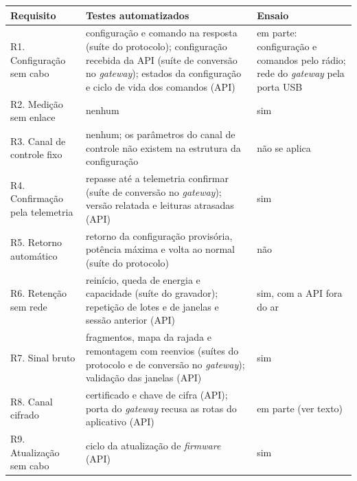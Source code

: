\begin{quadro}[!htb]
\centering\small
\caption{Requisitos da montagem de campo, testes e ensaios}\label{quadro:sis-rastreabilidade}
\begin{tabular}{@{}>{\raggedright\arraybackslash}p{32mm}>{\raggedright\arraybackslash}p{76mm}>{\raggedright\arraybackslash}p{42mm}@{}}
\toprule
Requisito & Testes automatizados & Ensaio \\
\midrule
R1. Configuração sem cabo & configuração e comando na resposta (suíte do protocolo); configuração recebida da API (suíte de conversão no \textit{gateway}); estados da configuração e ciclo de vida dos comandos (API) & em parte: configuração e comandos pelo rádio; rede do \textit{gateway} pela porta USB \\
\addlinespace
R2. Medição sem enlace & nenhum & sim \\
\addlinespace
R3. Canal de controle fixo & nenhum; os parâmetros do canal de controle não existem na estrutura da configuração & não se aplica \\
\addlinespace
R4. Confirmação pela telemetria & repasse até a telemetria confirmar (suíte de conversão no \textit{gateway}); versão relatada e leituras atrasadas (API) & sim \\
\addlinespace
R5. Retorno automático & retorno da configuração provisória, potência máxima e volta ao normal (suíte do protocolo) & não \\
\addlinespace
R6. Retenção sem rede & reinício, queda de energia e capacidade (suíte do gravador); repetição de lotes e de janelas e sessão anterior (API) & sim, com a API fora do ar \\
\addlinespace
R7. Sinal bruto & fragmentos, mapa da rajada e remontagem com reenvios (suítes do protocolo e de conversão no \textit{gateway}); validação das janelas (API) & sim \\
\addlinespace
R8. Canal cifrado & certificado e chave de cifra (API); porta do \textit{gateway} recusa as rotas do aplicativo (API) & em parte (ver texto) \\
\addlinespace
R9. Atualização sem cabo & ciclo da atualização de \textit{firmware} (API) & sim \\
\bottomrule
\end{tabular}
\end{quadro}

